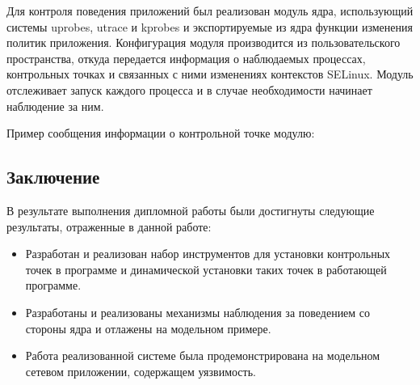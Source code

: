 \begin{comment}
Реализованная система позволяет размечать исполнимый код
наблюдаемых процессов контрольными точками. Для этого необходимо
сообщить в систему информацию об этих точках. Данный процесс описан
в разделе \ref{contpoints}. Система, получив все данные о
разметке приложений контрольными точками и об изменениях
контекстов, связанных с данными контрольными точками,
начинает наблюдение за запуском процессов. В случае запуска
процессов, относительно которых наблюдающая система располагает
информацией о разметке контрольными точками, система
начинает за ними наблюдение.

\end{comment}

Для контроля поведения приложений был реализован модуль ядра,
использующий системы uprobes, utrace и kprobes и экспортируемые
из ядра функции изменения политик приложения. Конфигурация
модуля производится из пользовательского пространства, откуда
передается информация о наблюдаемых процессах, контрольных точках
и связанных с ними изменениях контекстов SELinux. Модуль
отслеживает запуск каждого процесса и в случае необходимости
начинает наблюдение за ним.

Пример сообщения информации о контрольной точке модулю:




\subsection{Заключение}

В результате выполнения дипломной работы были достигнуты
следующие результаты, отраженные в данной работе:

\begin{itemize}

\item Разработан и реализован набор инструментов для установки
        контрольных точек в программе и динамической установки
        таких точек в работающей программе.

\item Разработаны и реализованы механизмы наблюдения за
        поведением со стороны ядра и отлажены на модельном примере.

\item Работа реализованной системе была продемонстрирована
        на модельном сетевом приложении, содержащем уязвимость.

\end{itemize}

